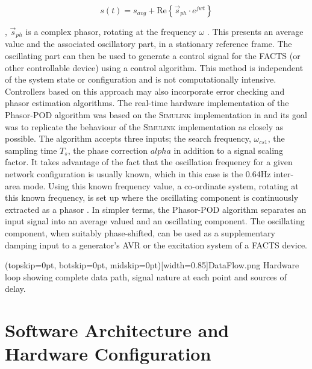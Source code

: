 \documentclass{ieeeaccess}
\begin{document}
\begin{equation}
s(t)={s}_{avg}+\mathrm{Re}\left\{{\stackrel{\to }{s}}_{ph}\cdot {e}^{{jwt}}\right\}
\end{equation}


, $\stackrel{\to }{s}_{ph}$ is a complex phasor, rotating at the frequency $\omega$ \cite{PhasorPOD}. This presents an average value and the associated oscillatory part, in a stationary reference frame. The oscillating part can then be used to generate a control signal for the FACTS (or other controllable device) using a control algorithm. This method is independent of the system state or configuration and is not computationally intensive. Controllers based on this approach may also incorporate error checking and phasor estimation algorithms. The real-time hardware implementation of the Phasor-POD algorithm was based on the \textsc{Simulink} implementation in \cite{PhasorPODImplement} and its goal was to replicate the behaviour of the \textsc{Simulink} implementation as closely as possible. The algorithm accepts three inputs; the search frequency, $\omega_{cs1}$, the sampling time $T_{s}$, the phase correction $alpha$ in addition to a signal scaling factor. It takes advantage of the fact that the oscillation frequency for a given network configuration is usually known, which in this case is the 0.64Hz inter-area mode. Using this known frequency value, a  co-ordinate system, rotating at this known frequency, is set up where the oscillating component is continuously extracted as a phasor \cite{PhasorPOD}. In simpler terms, the Phasor-POD algorithm separates an input signal into an average valued and an oscillating component. The oscillating component, when suitably phase-shifted, can be used as a supplementary damping input to a generator's AVR or the excitation system of a FACTS device.

\Figure[tbp](topskip=0pt, botskip=0pt, midskip=0pt)[width=0.85\textwidth]{DataFlow.png}
{Hardware loop showing complete data path, signal nature at each point and sources of delay.\label{Hardware_Outline}}

\section{Software Architecture and Hardware Configuration}\label{softhardware}
\end{document}
